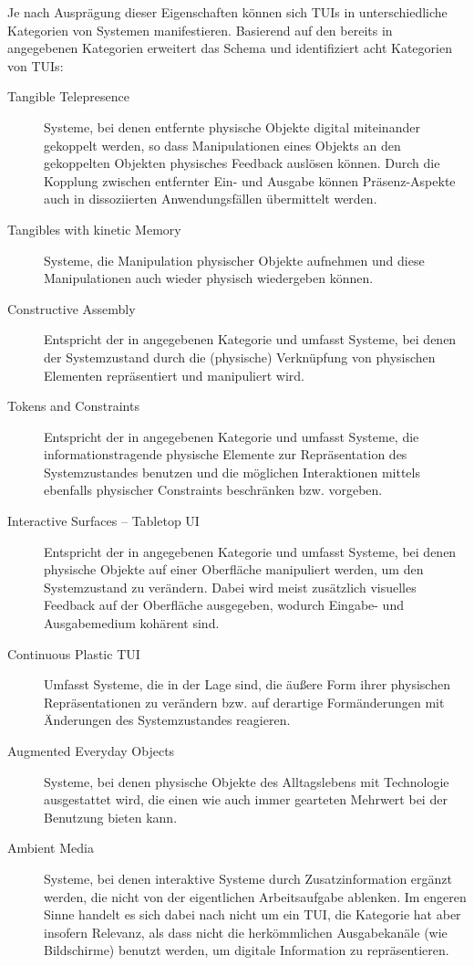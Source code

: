 Je nach Ausprägung dieser Eigenschaften können sich \glspl{TUI} in unterschiedliche Kategorien von Systemen manifestieren. Basierend auf den bereits in \citep{Ullmer05} angegebenen Kategorien erweitert \citeauthor{Ishii08} das Schema und identifiziert acht Kategorien von \glspl{TUI}:
\begin{description}
	\item[Tangible Telepresence] Systeme, bei denen entfernte physische Objekte digital miteinander gekoppelt werden, so dass Manipulationen eines Objekts an den gekoppelten Objekten physisches Feedback auslösen können. Durch die Kopplung zwischen entfernter Ein- und Ausgabe können Präsenz-Aspekte auch in dissoziierten Anwendungsfällen übermittelt werden.
	\item[Tangibles with kinetic Memory] Systeme, die Manipulation physischer Objekte aufnehmen und diese Manipulationen auch wieder physisch wiedergeben können.
	\item[Constructive Assembly] Entspricht der in \citep{Ullmer05} angegebenen Kategorie und umfasst Systeme, bei denen der Systemzustand durch die (physische) Verknüpfung von physischen Elementen repräsentiert und manipuliert wird.
	\item[Tokens and Constraints] Entspricht der in \citep{Ullmer05} angegebenen Kategorie und umfasst Systeme, die informationstragende physische Elemente zur Repräsentation des Systemzustandes benutzen und die möglichen Interaktionen mittels ebenfalls physischer Constraints beschränken bzw. vorgeben.
	\item[Interactive Surfaces -- Tabletop UI] Entspricht der in \citep{Ullmer05} angegebenen Kategorie und umfasst Systeme, bei denen physische Objekte auf einer Oberfläche manipuliert werden, um den Systemzustand zu verändern. Dabei wird meist zusätzlich visuelles Feedback auf der Oberfläche ausgegeben, wodurch Eingabe- und Ausgabemedium kohärent sind.
	\item[Continuous Plastic TUI] Umfasst Systeme, die in der Lage sind, die äußere Form ihrer physischen Repräsentationen zu verändern bzw. auf derartige Formänderungen mit Änderungen des Systemzustandes reagieren.
	\item[Augmented Everyday Objects] Systeme, bei denen physische Objekte des Alltagslebens mit Technologie ausgestattet wird, die einen wie auch immer gearteten Mehrwert bei der Benutzung bieten kann.
	\item[Ambient Media] Systeme, bei denen interaktive Systeme durch Zusatzinformation ergänzt werden, die nicht von der eigentlichen Arbeitsaufgabe ablenken. Im engeren Sinne handelt es sich dabei nach \citeauthor{Ishii08} nicht um ein \gls{TUI}, die Kategorie hat aber insofern Relevanz, als dass nicht die herkömmlichen Ausgabekanäle (wie Bildschirme) benutzt werden, um digitale Information zu repräsentieren.
\end{description}

